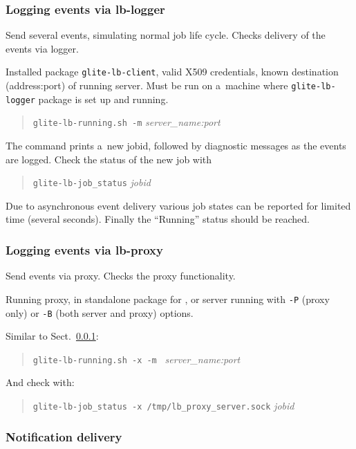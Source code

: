 \subsubsection{Logging events via lb-logger}

\label{smoke-log}

Send several \LB events, simulating normal job life cycle.
Checks delivery of the events via \LB logger.

\req Installed package \texttt{glite-lb-client}, valid X509 credentials,
known destination (address:port) of running \LB server.
Must be run on a~machine where \texttt{glite-lb-logger} package is set up and running.\footnotemark[\theexamplesfootnote]

\how
\begin{quote}
\texttt{glite-lb-running.sh -m} \emph{server\_name:port}
\end{quote}

The command prints a~new jobid, followed by diagnostic messages as the events are logged. 
Check the status of the new job with
\begin{quote}
\verb'glite-lb-job_status' \emph{jobid}
\end{quote}

\result
Due to asynchronous event
delivery various job states can be reported for limited time (several seconds).
Finally the
``Running'' status should be reached.

\subsubsection{Logging events via lb-proxy}

Send events via \LB proxy. Checks the proxy functionality.

\req Running \LB proxy, in standalone package for , or
\LB server running with \verb'-P' (proxy only) or \verb'-B' (both server and proxy)
options.\footnotemark[\theexamplesfootnote]

\how Similar to Sect.~\ref{smoke-log}:
\begin{quote}
\verb'glite-lb-running.sh -x -m ' \emph{server\_name:port}
\end{quote}

And check with:
\begin{quote}
\verb'glite-lb-job_status -x /tmp/lb_proxy_server.sock' \emph{jobid}
\end{quote}


\subsubsection{Notification delivery}

